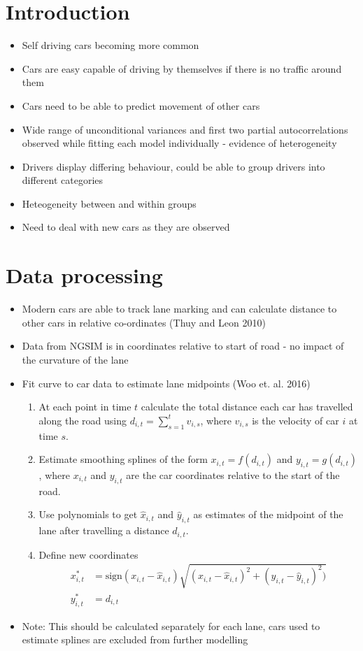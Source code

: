 \documentclass[12pt,a4paper]{article}\usepackage[]{graphicx}\usepackage[]{color}
\begin{document}
\section{Introduction}

\begin{itemize}
\item Self driving cars becoming more common
\item Cars are easy capable of driving by themselves if there is no traffic around them
\item Cars need to be able to predict movement of other cars
\item Wide range of unconditional variances and first two partial autocorrelations observed while fitting each model individually - evidence of heterogeneity
\item Drivers display differing behaviour, could be able to group drivers into different categories
\item Heteogeneity between and within groups
\item Need to deal with new cars as they are observed
\end{itemize}

\section{Data processing}

\begin{itemize}
\item Modern cars are able to track lane marking and can calculate distance to other cars in relative co-ordinates (Thuy and Leon 2010)
\item Data from NGSIM is in coordinates relative to start of road - no impact of the curvature of the lane
\item Fit curve to car data to estimate lane midpoints (Woo et. al. 2016) 
\begin{enumerate}
\item At each point in time $t$ calculate the total distance each car has travelled along the road using $d_{i, t} = \sum_{s=1}^t v_{i, s}$, where $v_{i, s}$ is the velocity of car $i$ at time $s$. 
\item Estimate smoothing splines of the form $x_{i, t} = f(d_{i, t})$ and $y_{i, t} = g(d_{i, t})$, where $x_{i, t}$ and $y_{i, t}$ are the car coordinates relative to the start of the road.
\item Use polynomials to get $\hat{x}_{i, t}$ and $\hat{y}_{i, t}$ as estimates of the midpoint of the lane after travelling a distance $d_{i, t}$.
\item Define new coordinates 
\begin{align}
x^*_{i, t} &= \mbox{sign}(x_{i, t} - \hat{x}_{i, t})\sqrt{(x_{i, t}-\hat{x}_{i, t})^2 + (y_{i, t} - \hat{y}_{i, t})^2)} \label{xRel} \\
y^*_{i, t} &= d_{i, t} \label{yRel}
\end{align}
\end{enumerate}
\item Note: This should be calculated separately for each lane, cars used to estimate splines are excluded from further modelling
\end{itemize}
\end{document}
